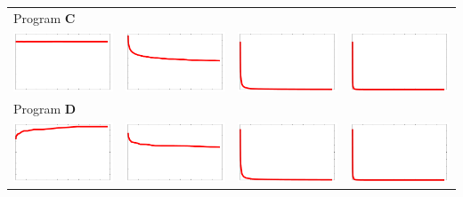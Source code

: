 \documentclass[a4paper]{article}
\begin{document}
\begin{center}
\begin{tabular}{cccc}
    \midrule
    \multicolumn{4}{l}{Program \textbf{C}} \\
    \quad
    \includegraphics[width=0.23\columnwidth]{fconst.pdf} &
    \includegraphics[width=0.23\columnwidth]{fconst-log.pdf} &
    \includegraphics[width=0.23\columnwidth]{fconst-n.pdf} &
    \includegraphics[width=0.23\columnwidth]{fconst-n2.pdf} \\
    \midrule
    \multicolumn{4}{l}{Program \textbf{D}} \\
    \quad
    \includegraphics[width=0.23\columnwidth]{flog2.pdf} &
    \includegraphics[width=0.23\columnwidth]{flog2-log.pdf} &
    \includegraphics[width=0.23\columnwidth]{flog2-n.pdf} &
    \includegraphics[width=0.23\columnwidth]{flog2-n2.pdf} \\

\end{tabular}
\end{center}
\end{document}
